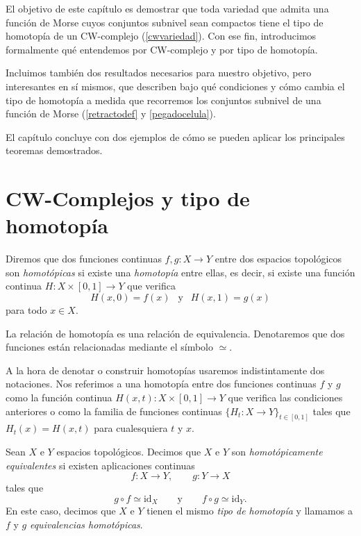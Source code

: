 
El objetivo de este capítulo es demostrar que toda variedad que admita una función de Morse cuyos conjuntos subnivel sean compactos tiene el tipo de homotopía de un CW-complejo (\ref{cwvariedad}). Con ese fin, introducimos formalmente qué entendemos por CW-complejo y por tipo de homotopía.

Incluimos también dos resultados necesarios para nuestro objetivo, pero interesantes en sí mismos, que describen bajo qué condiciones y cómo cambia el tipo de homotopía a medida que recorremos los conjuntos subnivel de una función de Morse (\ref{retractodef} y \ref{pegadocelula}). 

El capítulo concluye con dos ejemplos de cómo se pueden aplicar los principales teoremas demostrados.

\bigskip

\section{CW-Complejos y tipo de homotopía}

Diremos que dos funciones continuas $f, g:X\to Y$ entre dos espacios topológicos son \textit{homotópicas} si existe una \textit{homotopía} entre ellas, es decir, si existe una función continua $H:X\times [0,1]\to Y$ que verifica
\begin{equation*}
    H(x,0)=f(x) ~~\text{ y }~~ H(x,1)=g(x)
\end{equation*}
para todo $x\in X$. 

La relación de homotopía es una relación de equivalencia. Denotaremos que dos funciones están relacionadas mediante el símbolo $\simeq$.

A la hora de denotar o construir homotopías usaremos indistintamente dos notaciones. Nos referimos a una homotopía entre dos funciones continuas $f$ y $g$ como la función continua $H(x,t): X\times [0,1]\to Y$ que verifica las condiciones anteriores o como la familia de funciones continuas $\{H_t: X\to Y\}_{t\in [0,1]}$ tales que $H_t(x)=H(x,t)$ para cualesquiera $t$ y $x$.

\medskip

\begin{definition}
Sean $X$ e $Y$ espacios topológicos. Decimos que $X$ e $Y$ son
\textit{homotópicamente equivalentes} si existen aplicaciones continuas
\begin{equation*}
    f: X \to Y, \qquad g: Y \to X
\end{equation*}
tales que
\begin{equation*}
    g \circ f \simeq \mathrm{id}_X \qquad \text{y} \qquad f \circ g \simeq \mathrm{id}_Y.
\end{equation*}
En este caso, decimos que $X$ e $Y$ tienen el mismo \textit{tipo de homotopía} y llamamos a $f$ y $g$ \textit{equivalencias homotópicas}.
\end{definition}


